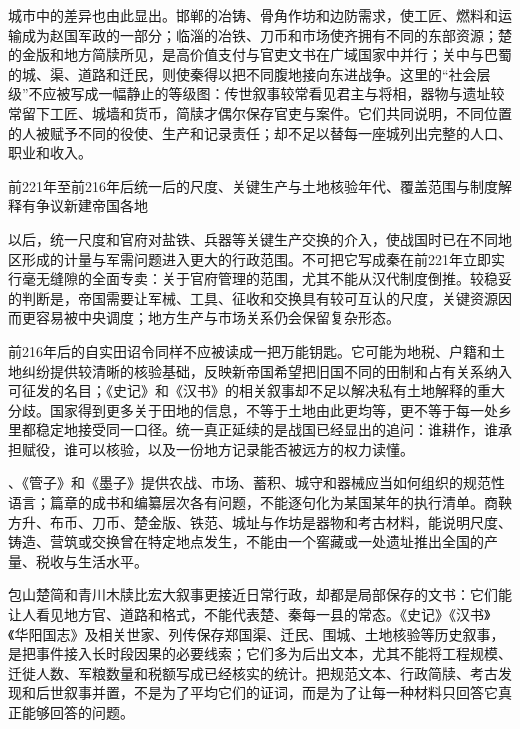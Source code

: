 城市中的差异也由此显出。邯郸的冶铸、骨角作坊和边防需求，使工匠、燃料和运输成为赵国军政的一部分；临淄的冶铁、刀币和市场使齐拥有不同的东部资源；楚的金版和地方简牍所见，是高价值支付与官吏文书在广域国家中并行；关中与巴蜀的城、渠、道路和迁民，则使秦得以把不同腹地接向东进战争。这里的“社会层级”不应被写成一幅静止的等级图：传世叙事较常看见君主与将相，器物与遗址较常留下工匠、城墙和货币，简牍才偶尔保存官吏与案件。它们共同说明，不同位置的人被赋予不同的役使、生产和记录责任；却不足以替每一座城列出完整的人口、职业和收入。

\begin{event}{前221年至前216年后}{统一后的尺度、关键生产与土地核验}{年代、覆盖范围与制度解释有争议}{新建帝国各地}

以后，统一尺度和官府对盐铁、兵器等关键生产交换的介入，使战国时已在不同地区形成的计量与军需问题进入更大的行政范围。不可把它写成秦在前221年立即实行毫无缝隙的全面专卖：关于官府管理的范围，尤其不能从汉代制度倒推。较稳妥的判断是，帝国需要让军械、工具、征收和交换具有较可互认的尺度，关键资源因而更容易被中央调度；地方生产与市场关系仍会保留复杂形态。

前216年后的自实田诏令同样不应被读成一把万能钥匙。它可能为地税、户籍和土地纠纷提供较清晰的核验基础，反映新帝国希望把旧国不同的田制和占有关系纳入可征发的名目；《史记》和《汉书》的相关叙事却不足以解决私有土地解释的重大分歧。国家得到更多关于田地的信息，不等于土地由此更均等，更不等于每一处乡里都稳定地接受同一口径。统一真正延续的是战国已经显出的追问：谁耕作，谁承担赋役，谁可以核验，以及一份地方记录能否被远方的权力读懂。
\end{event}

\begin{sourcenote}
、《管子》和《墨子》提供农战、市场、蓄积、城守和器械应当如何组织的规范性语言；篇章的成书和编纂层次各有问题，不能逐句化为某国某年的执行清单。商鞅方升、布币、刀币、楚金版、铁范、城址与作坊是器物和考古材料，能说明尺度、铸造、营筑或交换曾在特定地点发生，不能由一个窖藏或一处遗址推出全国的产量、税收与生活水平。

包山楚简和青川木牍比宏大叙事更接近日常行政，却都是局部保存的文书：它们能让人看见地方官、道路和格式，不能代表楚、秦每一县的常态。《史记》《汉书》《华阳国志》及相关世家、列传保存郑国渠、迁民、围城、土地核验等历史叙事，是把事件接入长时段因果的必要线索；它们多为后出文本，尤其不能将工程规模、迁徙人数、军粮数量和税额写成已经核实的统计。把规范文本、行政简牍、考古发现和后世叙事并置，不是为了平均它们的证词，而是为了让每一种材料只回答它真正能够回答的问题。
\end{sourcenote}

